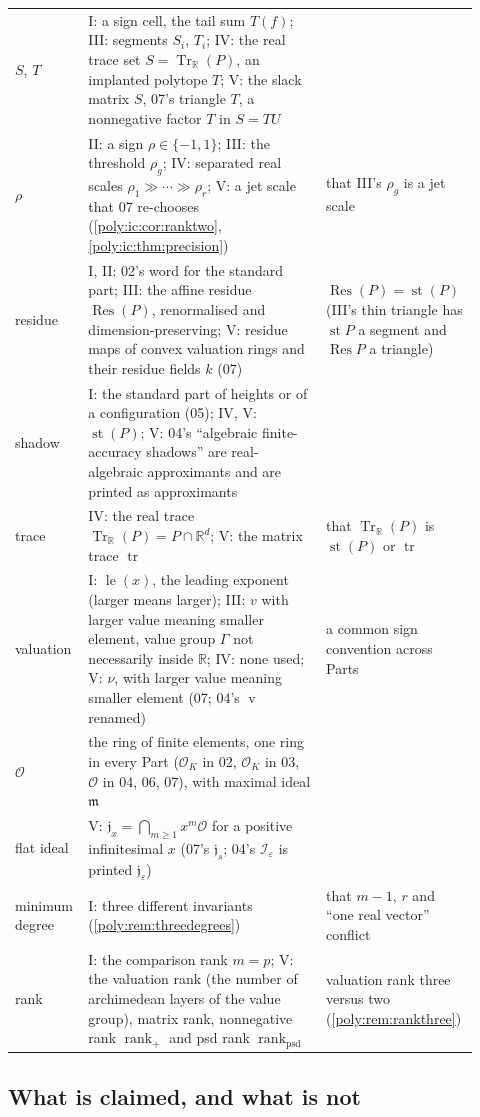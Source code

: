 \documentclass[11pt,a4paper]{article}
\numberwithin{equation}{section}
\theoremstyle{plain}
\newcommand{\R}{\mathbb R}
\newcommand{\eps}{\varepsilon}
\newcommand{\st}{\operatorname{st}}
\newcommand{\cO}{\mathcal{O}}
\newcommand{\Tr}{\operatorname{Tr}_{\R}}%
\newcommand{\OO}{\mathcal O}
\newcommand{\mm}{\mathfrak m}
\renewcommand{\vv}{\operatorname{v}}%
\newcommand{\Res}{\operatorname{Res}}
\newcommand{\JJ}{\mathfrak j}
\newcommand{\rankp}{\operatorname{rank}_{+}}
\newcommand{\rankpsd}{\operatorname{rank}_{\mathrm{psd}}}
\newcommand{\tr}{\operatorname{tr}}%
\begin{document}
{\begin{longtable}{@{}>{\raggedright\arraybackslash}p{0.12\linewidth}>{\raggedright\arraybackslash}p{0.5\linewidth}>{\raggedright\arraybackslash}p{0.3\linewidth}@{}}
$S$, $T$ & I: a sign cell, the tail sum $T(f)$; III: segments $S_i$, $T_i$; IV: the real trace set $S=\Tr(P)$, an implanted polytope $T$; V: the slack matrix $S$, 07's triangle $T$, a nonnegative factor $T$ in $S=TU$ & \\
$\rho$ & II: a sign $\rho\in\{-1,1\}$; III: the threshold $\rho_g$; IV: separated real scales $\rho_1\gg\cdots\gg\rho_r$; V: a jet scale that 07 re-chooses (\cref{poly:ic:cor:ranktwo}, \cref{poly:ic:thm:precision}) & that III's $\rho_g$ is a jet scale\\
residue & I, II: 02's word for the standard part; III: the affine residue $\Res(P)$, renormalised and dimension-preserving; V: residue maps of convex valuation rings and their residue fields $k$ (07) & $\Res(P)=\st(P)$ (III's thin triangle has $\st P$ a segment and $\Res P$ a triangle)\\
shadow & I: the standard part of heights or of a configuration (05); IV, V: $\st(P)$; V: 04's ``algebraic finite-accuracy shadows'' are real-algebraic approximants and are printed as approximants & \\
trace & IV: the real trace $\Tr(P)=P\cap\R^d$; V: the matrix trace $\tr$ & that $\Tr(P)$ is $\st(P)$ or $\tr$\\
valuation & I: $\operatorname{le}(x)$, the leading exponent (larger means larger); III: $v$ with larger value meaning smaller element, value group $\Gamma$ not necessarily inside $\R$; IV: none used; V: $\nu$, with larger value meaning smaller element (07; 04's $\vv$ renamed) & a common sign convention across Parts\\
$\OO$ & the ring of finite elements, one ring in every Part ($\cO_K$ in 02, $\mathcal O_K$ in 03, $\OO$ in 04, 06, 07), with maximal ideal $\mm$ & \\
flat ideal & V: $\JJ_x=\bigcap_{m\ge1}x^m\OO$ for a positive infinitesimal $x$ (07's $\mathfrak j_s$; 04's $\mathcal I_\eps$ is printed $\JJ_\eps$) & \\
minimum degree & I: three different invariants (\cref{poly:rem:threedegrees}) & that $m-1$, $r$ and ``one real vector'' conflict\\
rank & I: the comparison rank $m=p$; V: the valuation rank (the number of archimedean layers of the value group), matrix rank, nonnegative rank $\rankp$ and psd rank $\rankpsd$ & valuation rank three versus two (\cref{poly:rem:rankthree})\\
\end{longtable}
}

\subsection{What is claimed, and what is not}
\end{document}
